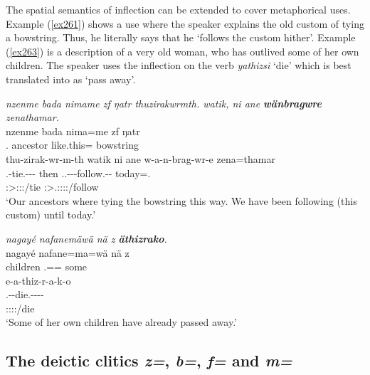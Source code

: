 The spatial semantics of  inflection can be extended to cover metaphorical uses. Example (\ref{ex261}) shows a  use where the speaker explains the old custom of tying a bowstring. Thus, he literally says that he `follows the custom hither'. Example (\ref{ex263}) is a description of a very old woman, who has outlived some of her own children. The speaker uses the  inflection on the verb \emph{yathizsi} `die' which is best translated into  as `pass away'.

\begin{exe}
	\ex \emph{nzenme bada nimame zf ŋatr thuzirakwrmth. watik, ni ane \textbf{wänbragwre} zenathamar.}\\
	\gll nzenme bada nima=me zf ŋatr\\
	\Fnsg.\Poss{} ancestor like.this=\Ins{} \Imm{} bowstring\\
	\sn
	\glll thu-zirak-wr-m-th watik ni ane w-a-n-brag-wr-e zena=thamar\\
	\Stnsg.\Betaone{}-tie.\Ext-\Ndu-\Dur-\Stnsg{} then \Fnsg{} \Dem{} \Tsg.\F.\Alph-\Vc-\Venit-follow.\Ext-\Ndu-\Fnsg{} today=\Temp.\All{}\\
	\footnotesize{\Stpl:\Sbj>\Stpl:\Obj:\Pst:\Dur/tie} {} {} {} \footnotesize{\Fpl:\Sbj>\Tsg.\F:\Obj:\Nonpast:\Ipfv:\Venit/follow} {}\\
	\trans `Our ancestors where tying the bowstring this way. We have been following (this custom) until today.'
	\label{ex261}
\end{exe}
\begin{exe}
	\ex \emph{nagayé nafanemäwä nä z \textbf{äthizrako}.}\\
	\gll nagayé nafane=ma=wä nä z\\
	children \Tsg.\Poss=\Char=\Emph{} some \Iam{}\\
	\sn
	\glll e-a-thiz-r-a-k-o\\
	\Stnsg.\Alph-\Vc-die.\Ext-\Ndu-\Pst-\Lk-\Andat{}\\
	\footnotesize{\Stpl:\Sbj:\Pst:\Ipfv:\Andat/die}\\
	\trans `Some of her own children have already passed away.'\\
	\label{ex263}
\end{exe}

\subsection{The deictic clitics \emph{z=}, \emph{b=}, \emph{f=} and \emph{m=}} \label{deicticcliticssection}


